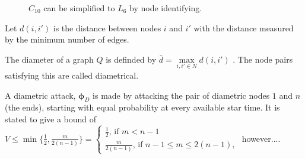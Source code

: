 \documentclass[11pt]{beamer}
\begin{document}
\begin{frame}{\insertsection}
\begin{figure}
\begin{center}
{
}
\end{center}
\caption{$C_{10}$ can be simplified to $L_{6}$ by node identifying.}
\end{figure}
\end{frame}

\begin{frame}{\insertsection}
Let $d(i,i')$ is the distance between nodes $i$ and $i'$ with the distance measured by the minimum number of edges.

\begin{definition}
The diameter of a graph $Q$ is definded by $\bar{d}=\max\limits_{i,i' \in N} d(i,i')$ . The node pairs satisfying this are called diametrical.
\end{definition}

A diametric attack, $\bm{\phi}_{D}$ is made by attacking the pair of diametric nodes $1$ and $n$ (the ends), starting with equal probability at every available star time. It is stated to give a bound of $V \leq \min\{\frac{1}{2},\frac{m}{2(n-1)}\}= \left\{
\begin{array}{l} 
\frac{1}{2} \text{, if } m<n-1 \\
\frac{m}{2(n-1)} \text{, if } n-1 \leq m \leq 2(n-1),
\end{array}
\right.$ however....
\end{frame}
\end{document}
